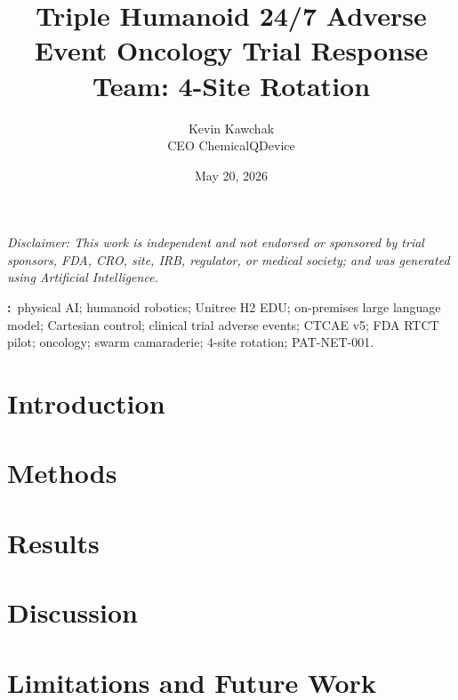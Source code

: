 \documentclass[11pt]{article}
\title{Triple Humanoid 24/7 Adverse Event Oncology Trial Response Team: 4-Site Rotation}
\author{%
  Kevin Kawchak\hspace{2pt}\orcidicon{0009-0007-5457-8667}\\
  CEO ChemicalQDevice\\
  \doiLink{10.5281/zenodo.xxxxxxxx}
}
\date{May 20, 2026}
\begin{document}
\maketitle

\begin{center}
\small\itshape
Disclaimer: This work is independent and not endorsed or sponsored by trial sponsors, FDA, CRO, site, IRB, regulator, or medical society; and was generated using Artificial Intelligence.
\end{center}

\vspace{0.4em}

\begin{abstract}

\end{abstract}

\noindent\textbf{\keywordsname:}\ physical AI; humanoid robotics; Unitree H2 EDU; on-premises large language model; Cartesian control; clinical trial adverse events; CTCAE v5; FDA RTCT pilot; oncology; swarm camaraderie; 4-site rotation; PAT-NET-001.

\section{Introduction}
\label{sec:introduction}


\newpage
{}
{}
\tableofcontents
\newpage

\section{Methods}
\label{sec:methods}


\section{Results}
\label{sec:results}


\section{Discussion}
\label{sec:discussion}


\section{Limitations and Future Work}
\label{sec:limitations}

\end{document}
